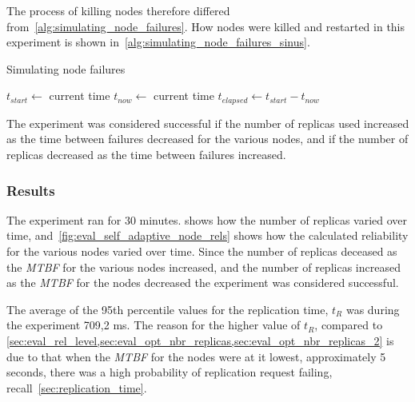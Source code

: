 \documentclass{cslthse-msc}
\begin{document}
The process of killing nodes therefore differed from~\cref{alg:simulating_node_failures}. How nodes were killed and restarted in this experiment is shown in~\cref{alg:simulating_node_failures_sinus}.

\begin{algorithm} 
	\caption{Simulating node failures} \label{alg:simulating_node_failures_sinus}
	\begin{algorithmic}[1]
	\State $t_{start}\gets$ current time
		\State
		\State $t_{now}\gets$ current time
		\State $t_{elapsed}\gets t_{start}-t_{now}$
		\State
		\State
	\EndWhile
	\end{algorithmic}
\end{algorithm}

The experiment was considered successful if the number of replicas used increased as the time between failures decreased for the various nodes, and if the number of replicas decreased as the time between failures increased.

\subsubsection*{Results}
The experiment ran for 30 minutes.  shows how the number of replicas varied over time, and~\cref{fig:eval_self_adaptive_node_rels} shows how the calculated reliability for the various nodes varied over time. Since the number of replicas deceased as the \emph{MTBF} for the various nodes increased, and the number of replicas increased as the \emph{MTBF} for the nodes decreased the experiment was considered successful. 

The average of the 95th percentile values for the replication time, $t_R$ was during the experiment 709,2 ms. The reason for the higher value of $t_R$, compared to \cref{sec:eval_rel_level,sec:eval_opt_nbr_replicas,sec:eval_opt_nbr_replicas_2} is due to that when the \emph{MTBF} for the nodes were at it lowest, approximately 5 seconds, there was a high probability of replication request failing, recall~\cref{sec:replication_time}.
\end{document}
